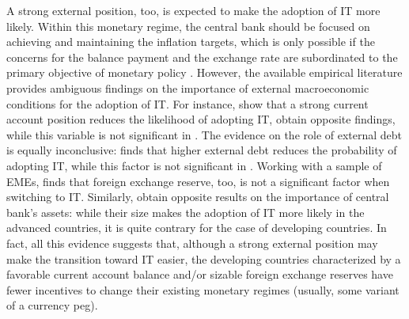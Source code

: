 \documentclass{article}
\begin{document}
A strong external position, too, is expected to make the adoption of IT more likely. Within this monetary regime, the central bank should be focused on achieving and maintaining the inflation targets, which is only possible if the concerns for the balance payment and the exchange rate are subordinated to the primary objective of monetary policy \citep{Carare2002}. However, the available empirical literature provides ambiguous findings on the importance of external macroeconomic conditions for the adoption of IT. For instance, \citet{arsic2022} show that a strong current account position reduces the likelihood of adopting IT, \citet{mukherjee2008} obtain opposite findings, while this variable is not significant in \citet{hu2006}. The evidence on the role of external debt is equally inconclusive: \citet{hu2006} finds that higher external debt reduces the probability of adopting IT, while this factor is not significant in \citet{samarina2014}. Working with a sample of EMEs, \citet{yamada2013} finds that foreign exchange reserve, too, is not a significant factor when switching to IT. Similarly, \citet{ardakani2018} obtain opposite results on the importance of central bank’s assets: while their size makes the adoption of IT more likely in the advanced countries, it is quite contrary for the case of developing countries. In fact, all this evidence suggests that, although a strong external position may make the transition toward IT easier, the developing countries characterized by a favorable current account balance and/or sizable foreign exchange reserves have fewer incentives to change their existing monetary regimes (usually, some variant of a currency peg).
\end{document}
